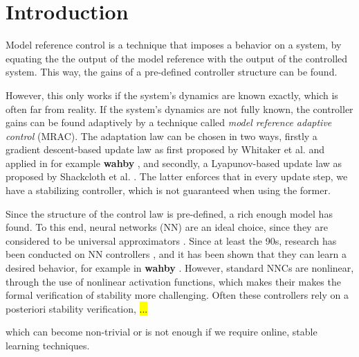 \section{Introduction}
Model reference control is a technique that imposes a behavior on a system, by equating the the output of the model reference with the output of the controlled system. This way, the gains of a pre-defined controller structure can be found. 

However, this only works if the system's dynamics are known exactly, which is often far from reality. If the system's dynamics are not fully known, the controller gains can be found adaptively by a technique called \textit{model reference adaptive control} (MRAC). The adaptation law can be chosen in two ways, firstly a gradient descent-based update law as first proposed by Whitaker et al. \cite{whitaker1959adaptive} and applied in for example \textbf{wahby} \cite{bosshartComparisonTwoPID2021}, and secondly, a Lyapunov-based update law as proposed by Shackcloth et al. \cite{shackclothSynthesisModelReference1965}. The latter enforces that in every update step, we have a stabilizing controller, which is not guaranteed when using the former.

Since the structure of the control law is pre-defined, a rich enough model has found. To this end, neural networks (NN) are an ideal choice, since they are considered to be universal approximators \cite{hornikUniversalApproximationUnknown1990a}. Since at least the 90s, research has been conducted on NN controllers \cite{jiangBriefReviewNeural2017}, and it has been shown that they can learn a desired behavior, for example in \textbf{wahby} \cite{congPIDLikeNeuralNetwork2009,thanhNonlinearPIDControl2006,norrisNeuralNetworksControl2021}. However, standard NNCs are nonlinear, through the use of nonlinear activation functions, which makes their makes the formal verification of stability more challenging. Often these controllers rely on a posteriori stability verification, \hl{...}

which can become non-trivial or is not enough if we require online, stable learning techniques.

